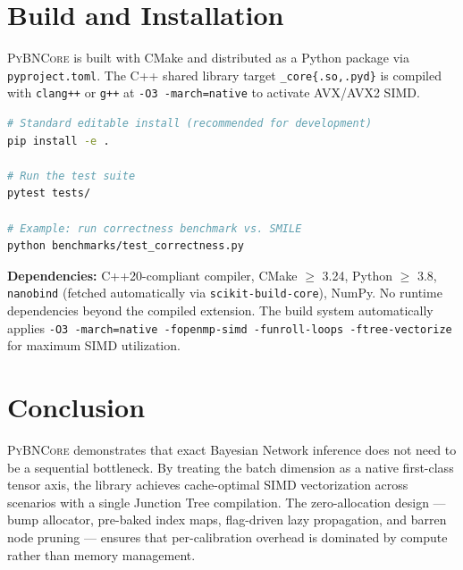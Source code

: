 \documentclass[11pt, letterpaper]{article}
\newcommand{\bncore}{\textsc{PyBNCore}}
\theoremstyle{definitionstyle}
\begin{document}
\section{Build and Installation}
\label{sec:build}

\bncore{} is built with CMake and distributed as a Python package via
\texttt{pyproject.toml}. The C++ shared library target
\texttt{\_core\{.so,.pyd\}} is compiled with \texttt{clang++} or
\texttt{g++} at \texttt{-O3 -march=native} to activate AVX/AVX2 SIMD.

\begin{lstlisting}[language=bash, basicstyle=\ttfamily\small,
                   backgroundcolor=\color{gray!5}, frame=single]
# Standard editable install (recommended for development)
pip install -e .

# Run the test suite
pytest tests/

# Example: run correctness benchmark vs. SMILE
python benchmarks/test_correctness.py
\end{lstlisting}

\noindent
\textbf{Dependencies:} C++20-compliant compiler, CMake $\geq$ 3.24,
Python $\geq$ 3.8, \texttt{nanobind} (fetched automatically via
\texttt{scikit-build-core}), NumPy. No runtime dependencies beyond the
compiled extension. The build system automatically applies
\texttt{-O3 -march=native -fopenmp-simd -funroll-loops -ftree-vectorize}
for maximum SIMD utilization.


\section{Conclusion}
\label{sec:conclusion}

\bncore{} demonstrates that exact Bayesian Network inference does not
need to be a sequential bottleneck. By treating the batch dimension as a
native first-class tensor axis, the library achieves cache-optimal SIMD
vectorization across scenarios with a single Junction Tree compilation.
The zero-allocation design --- bump allocator, pre-baked index maps,
flag-driven lazy propagation, and barren node pruning --- ensures that
per-calibration overhead is dominated by compute rather than memory
management.
\end{document}
